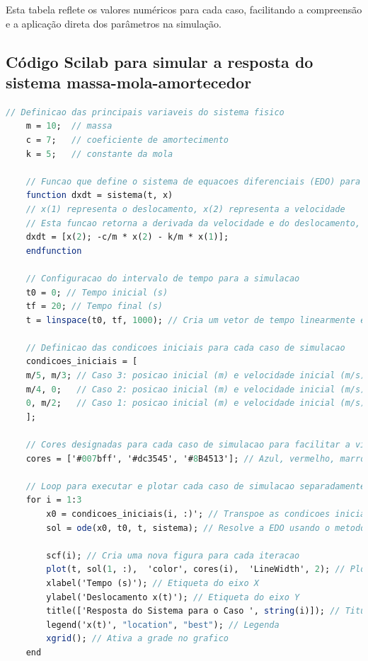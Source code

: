 Esta tabela reflete os valores numéricos para cada caso, facilitando a compreensão e a aplicação direta dos parâmetros na simulação.

\subsection{Código Scilab para simular a resposta do sistema massa-mola-amortecedor}
\begin{lstlisting}[language=Scilab, caption=Código Scilab para simular a resposta do sistema massa-mola-amortecedor]
    // Definicao das principais variaveis do sistema fisico
    m = 10;  // massa
    c = 7;   // coeficiente de amortecimento
    k = 5;   // constante da mola

    // Funcao que define o sistema de equacoes diferenciais (EDO) para o modelo massa-mola-amortecedor
    function dxdt = sistema(t, x)
    // x(1) representa o deslocamento, x(2) representa a velocidade
    // Esta funcao retorna a derivada da velocidade e do deslocamento, respectivamente
    dxdt = [x(2); -c/m * x(2) - k/m * x(1)];
    endfunction

    // Configuracao do intervalo de tempo para a simulacao
    t0 = 0; // Tempo inicial (s)
    tf = 20; // Tempo final (s)
    t = linspace(t0, tf, 1000); // Cria um vetor de tempo linearmente espacado para a simulacao

    // Definicao das condicoes iniciais para cada caso de simulacao
    condicoes_iniciais = [
    m/5, m/3; // Caso 3: posicao inicial (m) e velocidade inicial (m/s)
    m/4, 0;   // Caso 2: posicao inicial (m) e velocidade inicial (m/s)
    0, m/2;   // Caso 1: posicao inicial (m) e velocidade inicial (m/s)
    ];

    // Cores designadas para cada caso de simulacao para facilitar a visualizacao
    cores = ['#007bff', '#dc3545', '#8B4513']; // Azul, vermelho, marrom

    // Loop para executar e plotar cada caso de simulacao separadamente
    for i = 1:3
        x0 = condicoes_iniciais(i, :)'; // Transpoe as condicoes iniciais para a formatacao correta
        sol = ode(x0, t0, t, sistema); // Resolve a EDO usando o metodo de ODE

        scf(i); // Cria uma nova figura para cada iteracao
        plot(t, sol(1, :),  'color', cores(i),  'LineWidth', 2); // Plot do deslocamento x(t)
        xlabel('Tempo (s)'); // Etiqueta do eixo X
        ylabel('Deslocamento x(t)'); // Etiqueta do eixo Y
        title(['Resposta do Sistema para o Caso ', string(i)]); // Titulo do grafico
        legend('x(t)', "location", "best"); // Legenda
        xgrid(); // Ativa a grade no grafico
    end


\end{lstlisting}
